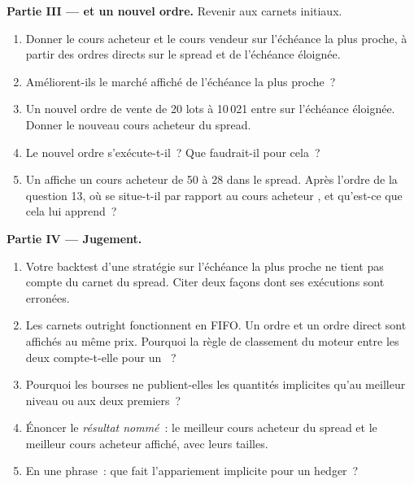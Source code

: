 \begin{problem}
\medskip\noindent\textbf{Partie III ---  et un nouvel ordre.}
Revenir aux carnets initiaux.
\begin{enumerate}[resume]
\item Donner le cours acheteur et le cours vendeur  sur l'échéance la plus proche, à partir des ordres directs
sur le spread et de l'échéance éloignée.
\item Améliorent-ils le marché affiché de l'échéance la plus proche~?
\item Un nouvel ordre de vente de 20 lots à 10\,021 entre sur l'échéance éloignée. Donner le nouveau
cours acheteur  du spread.
\item Le nouvel ordre s'exécute-t-il~? Que faudrait-il pour cela~?
\item Un  affiche un cours acheteur de 50 à 28 dans le spread. Après l'ordre
de la question 13, où se situe-t-il par rapport au cours acheteur , et
qu'est-ce que cela lui apprend~?
\end{enumerate}

\medskip\noindent\textbf{Partie IV --- Jugement.}
\begin{enumerate}[resume]
\item Votre backtest d'une stratégie sur l'échéance la plus proche ne tient pas compte du carnet du spread. Citer
deux façons dont ses exécutions sont erronées.
\item Les carnets outright fonctionnent en FIFO. Un ordre  et un ordre direct sont
affichés au même prix. Pourquoi la règle de classement du moteur entre les deux compte-t-elle
pour un ~?
\item Pourquoi les bourses ne publient-elles les quantités implicites qu'au meilleur niveau ou
aux deux premiers~?
\item Énoncer le \emph{résultat nommé}~: le meilleur cours acheteur  du spread et
le meilleur cours acheteur affiché, avec leurs tailles.
\item En une phrase~: que fait l'appariement implicite pour un hedger~?
\end{enumerate}
\end{problem}


